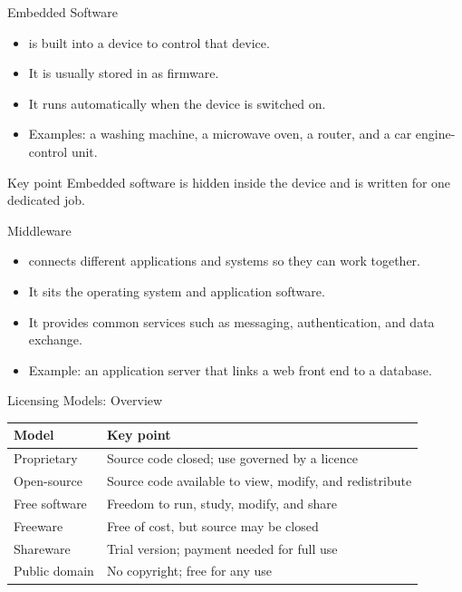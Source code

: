 \documentclass[aspectratio=169]{beamer}
\begin{document}
\begin{frame}{Embedded Software}
  \begin{itemize}
    \item {} is built into a device to control that
      device.
    \item It is usually stored in  as firmware.
    \item It runs automatically when the device is switched on.
    \item Examples: a washing machine, a microwave oven, a router, and a car
      engine-control unit.
  \end{itemize}
  \begin{block}{Key point}
    Embedded software is hidden inside the device and is written for one
    dedicated job.
  \end{block}
\end{frame}

\begin{frame}{Middleware}
  \begin{itemize}
    \item {} connects different applications and systems so
      they can work together.
    \item It sits  the operating system and application
      software.
    \item It provides common services such as messaging, authentication, and
      data exchange.
    \item Example: an application server that links a web front end to a
      database.
  \end{itemize}
\end{frame}

\begin{frame}{Licensing Models: Overview}
  \begin{center}
    \begin{tabular}{p{}p{}}
      \toprule
      \textbf{Model} & \textbf{Key point} \\
      \midrule
      Proprietary & Source code closed; use governed by a licence \\
      Open-source & Source code available to view, modify, and redistribute \\
      Free software & Freedom to run, study, modify, and share \\
      Freeware & Free of cost, but source may be closed \\
      Shareware & Trial version; payment needed for full use \\
      Public domain & No copyright; free for any use \\
      \bottomrule
    \end{tabular}
  \end{center}
  \vspace{0.2cm}
\end{frame}
\end{document}
